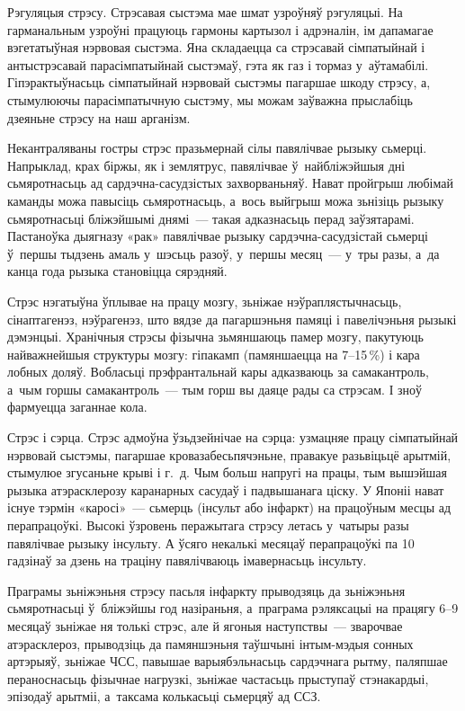 Рэгуляцыя стрэсу. Стрэсавая сыстэма мае шмат узроўняў рэгуляцыі. На гарманальным узроўні працуюць гармоны картызол і адрэналін, ім дапамагае вэгетатыўная нэрвовая сыстэма. Яна складаецца са стрэсавай сімпатыйнай і антыстрэсавай парасімпатыйнай сыстэмаў, гэта як газ і тормаз у~аўтамабілі. Гіпэрактыўнасьць сімпатыйнай нэрвовай сыстэмы пагаршае шкоду стрэсу, а, стымулюючы парасімпатычную сыстэму, мы можам заўважна прыслабіць дзеяньне стрэсу на наш арганізм.

Некантраляваны гостры стрэс празьмернай сілы павялічвае рызыку сьмерці. Напрыклад, крах біржы, як і землятрус, павялічвае ў~найбліжэйшыя дні сьмяротнасьць ад сардэчна-сасудзістых захворваньняў. Нават пройгрыш любімай каманды можа павысіць сьмяротнасьць, а~вось выйгрыш можа зьнізіць рызыку сьмяротнасьці бліжэйшымі днямі~--- такая адказнасьць перад заўзятарамі. Пастаноўка дыягназу «рак» павялічвае рызыку сардэчна-сасудзістай сьмерці ў~першы тыдзень амаль у~шэсьць разоў, у~першы месяц~--- у~тры разы, а~да канца года рызыка становіцца сярэдняй.

Стрэс нэгатыўна ўплывае на працу мозгу, зьніжае нэўраплястычнасьць, сінаптагенэз, нэўрагенэз, што вядзе да пагаршэньня памяці і павелічэньня рызыкі дэмэнцыі. Хранічныя стрэсы фізычна зьмяншаюць памер мозгу, пакутуюць найважнейшыя структуры мозгу: гіпакамп (памяншаецца на 7--15\,\%) і кара лобных доляў. Вобласьці прэфрантальнай кары адказваюць за самакантроль, а~чым горшы самакантроль~--- тым горш вы даяце рады са стрэсам. І зноў фармуецца заганнае кола.

Стрэс і сэрца. Стрэс адмоўна ўзьдзейнічае на сэрца: узмацняе працу сімпатыйнай нэрвовай сыстэмы, пагаршае кровазабесьпячэньне, правакуе разьвіцьцё арытмій, стымулюе згусаньне крыві і г.~д. Чым больш напругі на працы, тым вышэйшая рызыка атэрасклерозу каранарных сасудаў і падвышанага ціску. У Японіі нават існуе тэрмін «каросі»~--- сьмерць (інсульт або інфаркт) на працоўным месцы ад перапрацоўкі. Высокі ўзровень перажытага стрэсу летась у~чатыры разы павялічвае рызыку інсульту. А ўсяго некалькі месяцаў перапрацоўкі па 10 гадзінаў за дзень на траціну павялічваюць імавернасьць інсульту.

Праграмы зьніжэньня стрэсу пасьля інфаркту прыводзяць да зьніжэньня сьмяротнасьці ў~бліжэйшы год назіраньня, а~праграма рэляксацыі на працягу 6--9 месяцаў зьніжае ня толькі стрэс, але й ягоныя наступствы~--- зварочвае атэрасклероз, прыводзіць да памяншэньня таўшчыні інтым-мэдыя сонных артэрыяў, зьніжае ЧСС, павышае варыябэльнасьць сардэчнага рытму, паляпшае пераноснасьць фізычнае нагрузкі, зьніжае частасьць прыступаў стэнакардыі, эпізодаў арытміі, а~таксама колькасьці сьмерцяў ад ССЗ.

